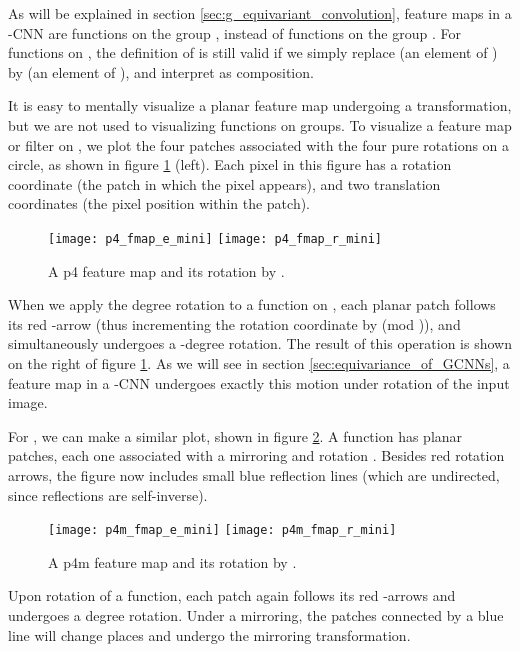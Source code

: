 \documentclass{article}
\begin{document}
As will be explained in section \ref{sec:g_equivariant_convolution}, feature maps in a -CNN are functions on the group , instead of functions on the group .
For functions on , the definition of  is still valid if we simply replace  (an element of ) by  (an element of ), and interpret  as composition.

It is easy to mentally visualize a planar feature map  undergoing a transformation, but we are not used to visualizing functions on groups.
To visualize a feature map or filter on , we plot the four patches associated with the four pure rotations on a circle, as shown in figure \ref{fig:p4_fmap} (left).
Each pixel in this figure has a rotation coordinate (the patch in which the pixel appears), and two translation coordinates (the pixel position within the patch).

\begin{figure}[!ht]
  \centering
  \texttt{[image: p4\_fmap\_e\_mini]}
  \texttt{[image: p4\_fmap\_r\_mini]}
  \caption{A p4 feature map and its rotation by .}
  \label{fig:p4_fmap}
\end{figure}


When we apply the  degree rotation  to a function on , each planar patch follows its red -arrow
(thus incrementing the rotation coordinate by  (mod )),
and simultaneously undergoes a -degree rotation.
The result of this operation is shown on the right of figure \ref{fig:p4_fmap}.
As we will see in section \ref{sec:equivariance_of_GCNNs}, a  feature map in a -CNN undergoes exactly this motion under rotation of the input image.

For , we can make a similar plot, shown in figure \ref{fig:p4m_fmap}.
A  function has  planar patches, each one associated with a mirroring  and rotation .
Besides red rotation arrows, the figure now includes small blue reflection lines (which are undirected, since reflections are self-inverse).

\begin{figure}[!ht]
  \centering
  \texttt{[image: p4m\_fmap\_e\_mini]}
  \texttt{[image: p4m\_fmap\_r\_mini]}
  \caption{A p4m feature map and its rotation by .}
  \label{fig:p4m_fmap}
\end{figure}

Upon rotation of a  function, each patch again follows its red -arrows and undergoes a  degree rotation.
Under a mirroring, the patches connected by a blue line will change places and undergo the mirroring transformation.
  
\end{document}
